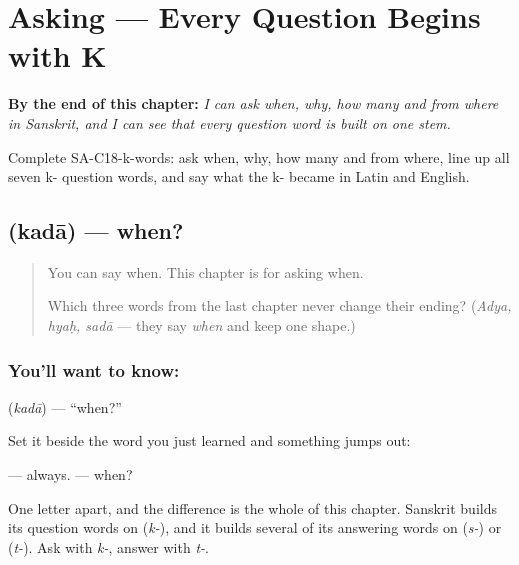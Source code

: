 
\chapter{Asking --- Every Question Begins with K}
\label{ch:sa-asking}

\begin{chapteropening}
\textbf{By the end of this chapter:} \emph{I can ask when, why, how many and from where in Sanskrit, and I can see that every question word is built on one stem.}

Complete SA-C18-k-words: ask when, why, how many and from where, line up all seven k- question words, and say what the k- became in Latin and English.
\end{chapteropening}

\section[\texorpdfstring{\sk{कदा} (kadā)}{कदा (kadā)}]{ (kadā) — when?}

\label{lesson:SA-C18-when}



\begin{quote}
You can say when. This chapter is for asking when.

Which three words from the last chapter never change their ending? (\emph{Adya, hyaḥ, sadā} — they say \emph{when} and keep one shape.)
\end{quote}

\subsection*{You'll want to know: }
\textbf{} (\emph{kadā}) — \textquotedblleft{}when?\textquotedblright{}

Set it beside the word you just learned and something jumps out:

\emph{} — always. \emph{} — when?

One letter apart, and the difference is the whole of this chapter. Sanskrit builds its question words on \textbf{} (\emph{k-}), and it builds several of its answering words on \textbf{} (\emph{s-}) or \textbf{} (\emph{t-}). Ask with \emph{k-}, answer with \emph{t-}.

